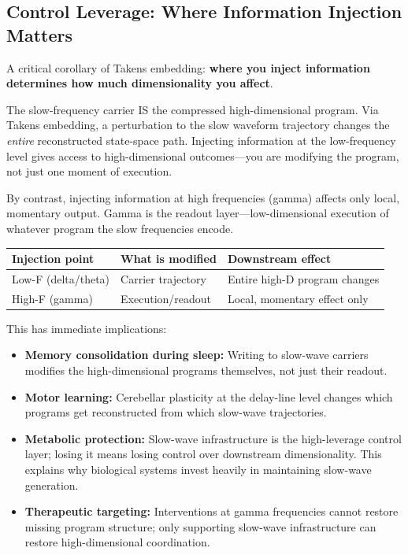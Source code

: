 \documentclass[12pt]{article}
\begin{document}
\subsection{Control Leverage: Where Information Injection Matters}

A critical corollary of Takens embedding: \textbf{where you inject information determines how much dimensionality you affect}.

The slow-frequency carrier IS the compressed high-dimensional program. Via Takens embedding, a perturbation to the slow waveform trajectory changes the \emph{entire} reconstructed state-space path. Injecting information at the low-frequency level gives access to high-dimensional outcomes---you are modifying the program, not just one moment of execution.

By contrast, injecting information at high frequencies (gamma) affects only local, momentary output. Gamma is the readout layer---low-dimensional execution of whatever program the slow frequencies encode.

\begin{center}
\begin{tabular}{@{}lll@{}}
\toprule
\textbf{Injection point} & \textbf{What is modified} & \textbf{Downstream effect} \\
\midrule
Low-F (delta/theta) & Carrier trajectory & Entire high-D program changes \\
High-F (gamma) & Execution/readout & Local, momentary effect only \\
\bottomrule
\end{tabular}
\end{center}

This has immediate implications:
\begin{itemize}
    \item \textbf{Memory consolidation during sleep:} Writing to slow-wave carriers modifies the high-dimensional programs themselves, not just their readout.
    \item \textbf{Motor learning:} Cerebellar plasticity at the delay-line level changes which programs get reconstructed from which slow-wave trajectories.
    \item \textbf{Metabolic protection:} Slow-wave infrastructure is the high-leverage control layer; losing it means losing control over downstream dimensionality. This explains why biological systems invest heavily in maintaining slow-wave generation.
    \item \textbf{Therapeutic targeting:} Interventions at gamma frequencies cannot restore missing program structure; only supporting slow-wave infrastructure can restore high-dimensional coordination.
\end{itemize}
\end{document}
